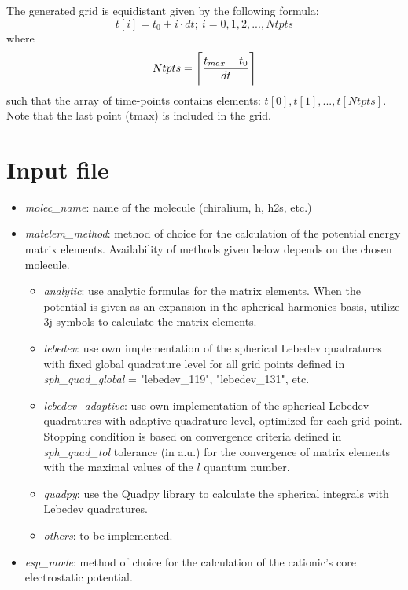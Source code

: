 \documentclass[a4paper,american,floatfix,pdftex,superscriptaddress,twoside,%
aps,pra,
linenumbers,%
reprint,%
]{revtex4-2}%
\DeclarePairedDelimiter{\ceil}{\lceil}{\rceil}
\begin{document}
The generated grid is equidistant given by the following formula:
\begin{equation}
t[i] = t_0 + i \cdot dt ;\ i=0,1,2,...,Ntpts
\end{equation}
where 
\begin{equation}
Ntpts = \ceil[\Bigg]{\frac{t_{max}-t_0}{dt}}
\end{equation}
such that the array of time-points contains elements: $t[0],t[1],...,t[Ntpts]$.
Note that the last point (tmax) is included in the grid. 

\section{Input file}


\begin{itemize}
	\item \textit{molec\_name}: name of the molecule (chiralium, h, h2s, etc.)
	\item \textit{matelem\_method}: method of choice for the calculation of the potential energy matrix elements. Availability of methods given below depends on the chosen molecule.
	\begin{itemize}
		\item \textit{analytic}: use analytic formulas for the matrix elements. When the potential is given as an expansion in the spherical harmonics basis, utilize 3j symbols to calculate the matrix elements.
		\item \textit{lebedev}: use own implementation of the spherical Lebedev quadratures with fixed global quadrature level for all grid points defined in \textit{sph\_quad\_global} = "lebedev\_119", "lebedev\_131", etc.
		\item \textit{lebedev\_adaptive}: use own implementation of the spherical Lebedev quadratures with adaptive quadrature level, optimized for each grid point. Stopping condition is based on convergence criteria defined in \textit{sph\_quad\_tol} tolerance (in a.u.) for the convergence of matrix elements with the maximal values of the $l$ quantum number. 
		\item \textit{quadpy}: use the Quadpy library to calculate the spherical integrals with Lebedev quadratures.
		\item \textit{others}: to be implemented.
	\end{itemize}
	\item \textit{esp\_mode}: method of choice for the calculation of the cationic's core electrostatic potential.
	\begin{itemize}

\end{itemize}
\end{itemize}
\end{document}
